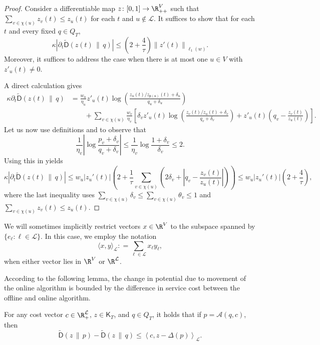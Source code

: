 \documentclass{toc}
\newcommand{\calA}{\mathcal A}
\newcommand{\calL}{\mathcal L}
\newcommand{\dmid}{\,\|\,}
\newcommand{\seteq}{\mathrel{\mathop:}=}
\newcommand{\sfp}{\mathsf{p}}
\newcommand{\sfD}{\mathsf D}
\newcommand{\sfK}{\mathsf K}
\newcommand{\tilD}{\tilde{\sfD}}
\newcommand{\llangle}{\left\langle}
\newcommand{\rrangle}{\right\rangle}
\begin{document}
\begin{proof}
	Consider a differentiable map $z\colon[0,1]\to \R_{++}^V$ such that $\sum_{v\in\chi(u)}z_v(t)\le z_u(t)$ for each $t$ and $u\notin\calL$.
	It suffices to show that for each $t$ and every fixed $q \in Q_T$,
	\[
	\kappa \left|\partial_t \tilD(z(t) \dmid q)\right| \leq \left(2+\frac{4}{\tau}\right) \left\|z'(t)\right\|_{\ell_1(w)}.
	\]
	Moreover, it suffices to address the case when there is at most one $u \in V$ with $z'_u(t) \neq 0$.
	
	A direct calculation gives
	\begin{align}
	\kappa \partial_t \tilD(z(t) \dmid q) &= \frac{w_u}{\eta_u} z'_u(t) \log \left(\frac{z_u(t)/z_{\sfp(u)}(t)+\delta_u}{q_u+\delta_u}\right) \nonumber \\
	&\qquad 
	+ \sum_{v \in \chi(u)} \frac{w_v}{\eta_v} 
	\left[\delta_v z'_u(t) \log \left(\frac{z_v(t)/z_u(t)+\delta_v}{q_v+\delta_v}\right)
	+ z'_u(t) \left(q_v - \frac{z_v(t)}{z_u(t)}\right)
	\right].\label{eq:tD}
	\end{align}
	Let us now use definitions  and 
	to observe that
	\[
	\frac{1}{\eta_v} \left|\log \frac{p_v+\delta_v}{q_v+\delta_v}\right| \leq \frac{1}{\eta_v} \log \frac{1+\delta_v}{\delta_v} \leq 2.
	\]
	Using this in  yields
	\[
	\kappa \left|\partial_t \tilD(z(t) \dmid q)\right| \leq w_u |z_u'(t)| \left(2 + \frac{1}{\tau} \sum_{v \in \chi(u)}
	\left(2\delta_v + \left|q_v-\frac{z_v(t)}{z_u(t)}\right|\right)\right)
	\leq w_u |z_u'(t)| \left(2+\frac{4}{\tau}\right),
	\]
	where the last inequality uses $\sum_{v \in \chi(u)} \delta_v \leq \sum_{v \in \chi(u)} \theta_v \leq 1$ and $\sum_{v\in\chi(u)}z_v(t)\le z_u(t)$.
\end{proof}

We will sometimes implicitly restrict vectors $x \in \R^{V}$ to the subspace spanned by $\{ e_{\ell} : \ell \in \calL \}$.
In this case, we employ the notation
\[
\langle x,y \rangle_{\calL} \seteq \sum_{\ell \in \calL} x_{\ell} y_{\ell},
\]
when either vector lies in $\R^V$ or $\R^{\calL}$.

According to the following lemma, the change in potential due to movement of the online algorithm is bounded by the difference in service cost between the offline and online algorithm.
\begin{lemma}\label{lem:sc}
	For any cost vector $c \in \R_+^{\calL}$, $z \in \sfK_T$, and $q \in Q_T$, it holds that if $p = \calA(q,c)$, then
	\[
	\tilD(z \dmid p) - \tilD(z \dmid q) \leq \llangle c, z - \Delta(p)\rrangle_{\calL}.
	\]
\end{lemma}
\end{document}
